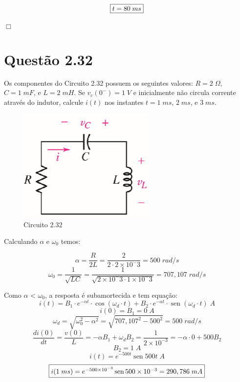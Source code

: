 \documentclass[
	12pt,				%
	oneside,			%
	a4paper,			%
	english,			%
	french,				%
	spanish,			%
	brazil				%
	]{abntex2}
\DeclareMathOperator{\sen}{sen}
\begin{document}
\begin{equation}
    \fbox{$t=80\;ms$}
\end{equation}


\begin{flushright}
    $\Box$
\end{flushright}
\newpage


\section*{Questão 2.32}
Os componentes do Circuito 2.32 possuem os seguintes valores: $R=2\;\Omega$, $C=1\;mF$, e $L=2\;mH$. Se $v_c(0^-)=1\;V$ e inicialmente não circula corrente através do indutor, calcule $i(t)$ nos instantes $t=1\;ms$, $2\;ms$, e $3\;ms$. 
\begin{figure}[htb]
	\centering
	\includegraphics[scale=0.7]{2-32.PNG}
	\caption{Circuito 2.32}
\end{figure}

Calculando $\alpha$ e $\omega_0$ temos:

$$\alpha={\dfrac{R}{2L}}={\dfrac{2}{2\cdot2\times10^-3}}=500 \;rad/s$$
$$\omega_0={\dfrac{1}{\sqrt{LC}}}={\dfrac{1}{\sqrt{2\times10^-3\cdot1\times10^-3}}}=707,107\;rad/s$$

Como $\alpha$ < $\omega_0$, a resposta é subamortecida e tem equação:
$$i(t)=B_1\cdot e^{-\alpha t} \cdot \cos\left(\omega_d\cdot t\right)+ B_2\cdot e^{-\alpha t} \cdot\sen\left(\omega_d\cdot t\right)\;A$$
$$i(0)=B_1=0\;A$$
$${\omega_d=\sqrt{\omega_0^2-\alpha^2}}={\sqrt{707,107^2-500^2}}=500 \;rad/s$$
$${\dfrac{di(0)}{dt}}={\dfrac{v(0)}{L}}=-\alpha B_1+\omega_d B_2={\dfrac{1}{2\times10^{-3}}}=-\alpha\cdot0+500B_2$$
$$B_2=1\;A$$
$$i(t)=e^{-500t}\sen{500t}\;A$$
\begin{equation}
    \fbox{$i(1\;ms)=e^{-500\times10^{-3}}\sen{500\times10^{-3}}=290,786\;mA$}
\end{equation}
\end{document}
